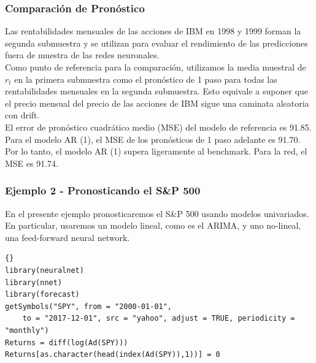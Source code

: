 	\subsubsection{\textbf{Comparaci\'on de Pron\'ostico}}
	Las rentabilidades mensuales de las acciones de IBM en 1998 y 1999 forman la segunda submuestra y se utilizan para evaluar el rendimiento de las predicciones fuera de muestra de las redes neuronales.\\
	Como punto de referencia para la comparaci\'on, utilizamos la media muestral de $r_t$ en la primera submuestra como el pron\'ostico de 1 paso para todas las rentabilidades mensuales en la segunda submuestra. Esto equivale a suponer que el precio mensual del precio de las acciones de IBM sigue una caminata aleatoria con drift.\\ 
	El error de pron\'ostico cuadr\'atico medio (MSE) del modelo de referencia es 91.85. Para el modelo AR (1), el MSE de los pron\'osticos de 1 paso adelante es 91.70. Por lo tanto, el modelo AR (1) supera ligeramente al benchmark. Para la red, el MSE es 91.74.
\subsubsection{\textbf{Ejemplo 2 - Pronosticando el S\&P 500}}
	
	
En el presente ejemplo pronosticaremos el S\&P 500 usando modelos univariados. 
En particular, usaremos un modelo lineal, como es el ARIMA, y uno no-lineal, una feed-forward neural network.
	
	\vspace{4mm}	
	
%			
%			
%			
\begin{lstlisting}[title={‘Código R: Pronóstico de SP500},basicstyle=\ttfamily]{}
library(neuralnet)
library(nnet)
library(forecast)
getSymbols("SPY", from = "2000-01-01", 
	to = "2017-12-01", src = "yahoo", adjust = TRUE, periodicity = "monthly")
Returns = diff(log(Ad(SPY)))
Returns[as.character(head(index(Ad(SPY)),1))] = 0
\end{lstlisting}
	
